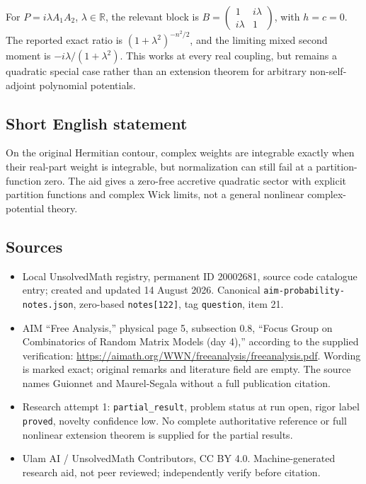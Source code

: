 \documentclass[11pt]{article}
\newcommand{\R}{\mathbb{R}}
\begin{document}
For $P=i\lambda A_1A_2$, $\lambda\in\R$, the relevant block is $B=\left(\begin{smallmatrix}1&i\lambda\\i\lambda&1\end{smallmatrix}\right)$, with $h=c=0$. The reported exact ratio is $(1+\lambda^2)^{-n^2/2}$, and the limiting mixed second moment is $-i\lambda/(1+\lambda^2)$. This works at every real coupling, but remains a quadratic special case rather than an extension theorem for arbitrary non-self-adjoint polynomial potentials.
\subsection{Short English statement}
On the original Hermitian contour, complex weights are integrable exactly when their real-part weight is integrable, but normalization can still fail at a partition-function zero. The aid gives a zero-free accretive quadratic sector with explicit partition functions and complex Wick limits, not a general nonlinear complex-potential theory.
\subsection{Sources}
\begin{itemize}
\item Local UnsolvedMath registry, permanent ID 20002681, source code catalogue entry; created and updated 14 August 2026. Canonical \texttt{aim-probability-notes.json}, zero-based \texttt{notes[122]}, tag \texttt{question}, item 21.
\item AIM ``Free Analysis,'' physical page 5, subsection 0.8, ``Focus Group on Combinatorics of Random Matrix Models (day 4),'' according to the supplied verification: \url{https://aimath.org/WWN/freeanalysis/freeanalysis.pdf}. Wording is marked exact; original remarks and literature field are empty. The source names Guionnet and Maurel-Segala without a full publication citation.
\item Research attempt 1: \texttt{partial\_result}, problem status at run open, rigor label \texttt{proved}, novelty confidence low. No complete authoritative reference or full nonlinear extension theorem is supplied for the partial results.
\item Ulam AI / UnsolvedMath Contributors, CC BY 4.0. Machine-generated research aid, not peer reviewed; independently verify before citation.
\end{itemize}
\end{document}
